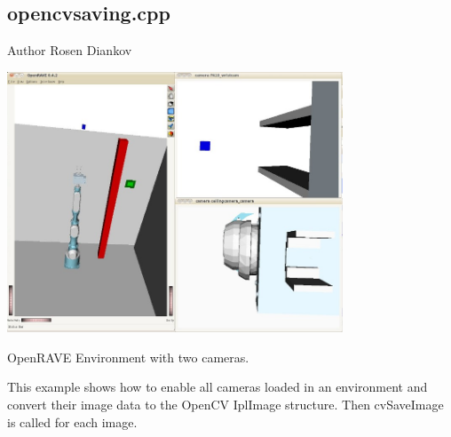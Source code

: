 \hypertarget{opencvsaving.cpp-example}{
\subsection{opencvsaving.cpp}
}
\begin{DoxyAuthor}{Author}
Rosen Diankov
\end{DoxyAuthor}
 
\begin{DoxyImage}
\includegraphics[width=10cm]{cppexample_opencvsaving.jpg}
\caption{OpenRAVE Environment with two cameras.}
\end{DoxyImage}


This example shows how to enable all cameras loaded in an environment and convert their image data to the OpenCV IplImage structure. Then cvSaveImage is called for each image.


